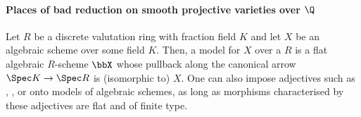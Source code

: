     \paragraph{Places of bad reduction on smooth projective varieties over \texorpdfstring{$\Q$}{}}
        \begin{definition}[Models]
            Let $R$ be a discrete valutation ring with fraction field $K$ and let $X$ be an algebraic scheme over some field $K$. Then, a model for $X$ over a $R$ is a flat algebraic $R$-scheme $\bbX$ whose pullback along the canonical arrow $\Spec K \to \Spec R$ is (isomorphic to) $X$. One can also impose adjectives such as , , or  onto models of algebraic schemes, as long as morphisms characterised by these adjectives are flat and of finite type.
        \end{definition}
    
